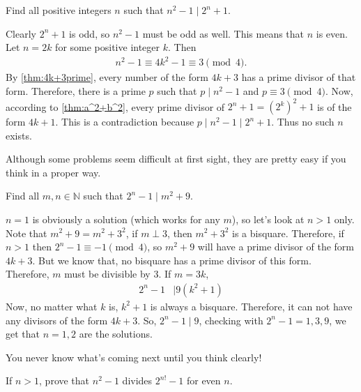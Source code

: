\begin{problem}
	Find all positive integers $n$ such that $n^2-1\mid 2^n+1$.
\end{problem}

\begin{solution}
	Clearly $2^n+1$ is odd, so $n^2-1$ must be odd as well. This means that $n$ is even. Let $n=2k$ for some positive integer $k$. Then
		\begin{align*}
			n^2-1 \equiv 4k^2 - 1 \equiv 3 \pmod 4.
		\end{align*}
	By \autoref{thm:4k+3prime}, every number of the form $4k+3$ has a prime divisor of that form. Therefore, there is a prime $p$ such that $p\mid n^2-1$ and $p \equiv 3 \pmod 4$. Now, according to \autoref{thm:a^2+b^2}, every prime divisor of $2^{n}+1=\left(2^{k}\right)^2 + 1$ is of the form $4k+1$. This is a contradiction because $p\mid n^2-1\mid 2^n+1$. Thus no such $n$ exists.
\end{solution}

\begin{note}
	Although some problems seem difficult at first sight, they are pretty easy if you think in a proper way.
\end{note}

\begin{problem}
	Find all $m,n\in\mathbb{N}$ such that $2^n-1\mid m^2+9$.
\end{problem}

\begin{solution}
	$n=1$ is obviously a solution (which works for any $m$), so let's look at $n>1$ only. Note that $m^2+9=m^2+3^2$, if $m\perp3$, then $m^2+3^2$ is a bisquare. Therefore, if $n>1$ then $2^n-1\equiv-1\pmod4$, so $m^2+9$ will have a prime divisor of the form $4k+3$. But we know that, no bisquare has a prime divisor of this form. Therefore, $m$ must be divisible by $3$. If $m=3k$,
	\begin{align*}
	2^n-1 & \mid 9(k^2+1)
	\end{align*}
	Now, no matter what $k$ is, $k^2+1$ is always a bisquare. Therefore, it can not have any divisors of the form $4k+3$. So, $2^n-1\mid 9$, checking with $2^n-1=1,3,9$, we get that $n=1,2$ are the solutions.
\end{solution}
You never know what's coming next until you think clearly!
\begin{problem}
	If $n>1$, prove that $n^2-1$ divides $2^{n!}-1$ for even $n$.
\end{problem}

